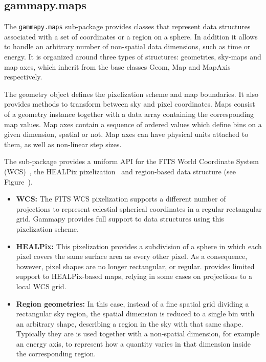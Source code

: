 \subsection{gammapy.maps}
\label{ssec:gammapy-maps}
The \verb|gammapy.maps| sub-package provides classes that represent data
structures associated with a set of coordinates or a region on a sphere. In
addition it allows to handle an arbitrary number of non-spatial data
dimensions, such as time or energy. It is organized around three types of
structures: geometries, sky-maps and map axes, which inherit from the base
classes Geom, Map and MapAxis respectively.

The geometry object defines the pixelization scheme and map boundaries. It also
provides methods to transform between sky and pixel coordinates. Maps consist
of a geometry instance together with a data array containing the corresponding
map values. Map axes contain a sequence of ordered values which define bins on
a given dimension, spatial or not. Map axes can have physical units attached to
them, as well as non-linear step sizes.

The sub-package provides a uniform API for the FITS World Coordinate System
(WCS)~\citep{Calabretta2002}, the HEALPix pixelization~\citep{Gorski2005} and
region-based data structure (see Figure~\cite{ig*:minted:gp_maps}).

\begin{itemize}
	\item \textbf{WCS: } The FITS WCS pixelization supports a different
	      number of projections to represent celestial spherical coordinates in a regular
	      rectangular grid. Gammapy provides full support to data structures using this
	      pixelization scheme.
	 \item \textbf{HEALPix: } This pixelization provides a
	      subdivision of a sphere in which each pixel covers the same surface area as
	      every other pixel. As a consequence, however, pixel shapes are no longer
	      rectangular, or regular. \gammapy provides limited support to HEALPix-based
	      maps, relying in some cases on projections to a local WCS grid. 
   \item \textbf{Region geometries: } In this case, instead of a fine spatial grid
	      dividing a rectangular sky region, the spatial dimension is reduced to a single
	      bin with an arbitrary shape, describing a region in the sky with that same
	      shape. Typically they are is used together with a non-spatial dimension, for
	      example an energy axis, to represent how a quantity varies in that dimension
	      inside the corresponding region. \end{itemize}

